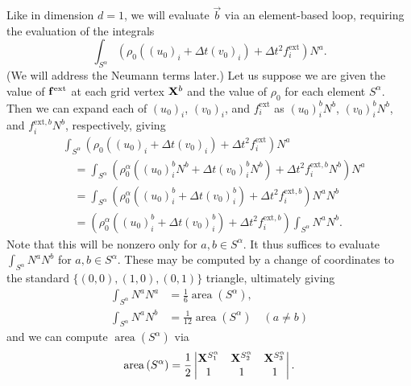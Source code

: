 Like in dimension $d = 1$, we will evaluate $\vec{b}$ via an element-based loop, requiring the evaluation of the integrals
\begin{equation*}
\int_{S^{\alpha}} \left( \rho_0 \left( (u_0)_i + \Delta t (v_0)_i \right) + \Delta t^2 f^{\text{ext}}_i \right) N^a.
\end{equation*}
(We will address the Neumann terms later.) Let us suppose we are given the value of $\mathbf{f}^{\text{ext}}$ at each grid vertex $\mathbf{X}^b$ and the value of $\rho_0$ for each element $S^{\alpha}$. Then we can expand each of $(u_0)_i$, $(v_0)_i$, and $f^{\text{ext}}_i$ as $(u_0)_i^b N^b$, $(v_0)_i^b N^b$, and $f^{\text{ext},b}_i N^b$, respectively, giving
\begin{equation*}
\begin{split}
& \int_{S^{\alpha}} \left( \rho_0 \left( (u_0)_i + \Delta t (v_0)_i \right) + \Delta t^2 f^{\text{ext}}_i \right) N^a \\
& \quad = \int_{S^{\alpha}} \left( \rho_0^{\alpha} \left( (u_0)_i^b N^b + \Delta t (v_0)_i^b N^b \right) + \Delta t^2 f^{\text{ext},b}_i N^b \right) N^a \\
& \quad = \int_{S^{\alpha}} \left( \rho_0^{\alpha} \left( (u_0)_i^b + \Delta t (v_0)_i^b \right) + \Delta t^2 f^{\text{ext},b}_i \right) N^a N^b \\
& \quad = \left( \rho_0^{\alpha} \left( (u_0)_i^b + \Delta t (v_0)_i^b \right) + \Delta t^2 f^{\text{ext},b}_i \right) \int_{S^{\alpha}} N^a N^b.
\end{split}
\end{equation*}
Note that this will be nonzero only for $a,b \in S^{\alpha}$. It thus suffices to evaluate $\int_{S^{\alpha}} N^a N^b$ for $a,b \in S^{\alpha}$. These may be computed by a change of coordinates to the standard $\{(0,0), (1,0), (0,1)\}$ triangle, ultimately giving
\begin{subequations} \label{eq:integral_Na_Nb.2d}
\begin{align}
\int_{S^{\alpha}} N^a N^a & = \frac{1}{6} \operatorname{area} \left( S^{\alpha} \right), \\
\int_{S^{\alpha}} N^a N^b & = \frac{1}{12} \operatorname{area} \left( S^{\alpha} \right) \quad \left( a \neq b \right)
\end{align}
\end{subequations}
and we can compute $\operatorname{area} \left( S^{\alpha} \right)$ via
\begin{equation*}
\operatorname{area} \left( S^{\alpha} \right) = \frac{1}{2} \begin{vmatrix} \mathbf{X}^{S^{\alpha}_1} & \mathbf{X}^{S^{\alpha}_2} & \mathbf{X}^{S^{\alpha}_3} \\ 1 & 1 & 1 \end{vmatrix}.
\end{equation*}
